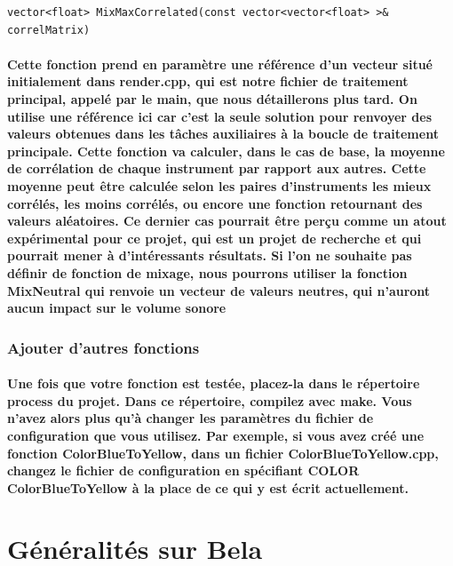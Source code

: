 \documentclass[a4paper]{article}
\begin{document}
\begin{lstlisting}
vector<float> MixMaxCorrelated(const vector<vector<float> >& correlMatrix)
\end{lstlisting}

\paragraph{Cette fonction prend en paramètre une référence d'un vecteur situé
initialement dans render.cpp, qui est notre fichier de traitement principal,
appelé par le main, que nous détaillerons plus tard. On utilise une référence
ici car c'est la seule solution pour renvoyer des valeurs obtenues dans les
tâches auxiliaires à la boucle de traitement principale. Cette fonction va
calculer, dans le cas de base, la moyenne de corrélation de chaque instrument
par rapport aux autres. Cette moyenne peut être calculée selon les paires
d'instruments les mieux corrélés, les moins corrélés, ou encore une fonction
retournant des valeurs aléatoires. Ce dernier cas pourrait être perçu comme un
atout expérimental pour ce projet, qui est un projet de recherche et qui
pourrait mener à d'intéressants résultats. Si l'on ne souhaite pas définir de
fonction de mixage, nous pourrons utiliser la fonction MixNeutral qui renvoie un
vecteur de valeurs neutres, qui n'auront aucun impact sur le volume sonore}

\subsubsection{Ajouter d'autres fonctions} \paragraph{Une fois que votre
fonction est testée, placez-la dans le répertoire process du projet. Dans ce
répertoire, compilez avec make. Vous n’avez alors plus qu’à changer les
paramètres du fichier de configuration que vous utilisez. Par exemple, si vous
avez créé une fonction ColorBlueToYellow, dans un fichier ColorBlueToYellow.cpp,
changez le fichier de configuration en spécifiant COLOR ColorBlueToYellow à la
place de ce qui y est écrit actuellement.}

\section{Généralités sur Bela}
\end{document}
